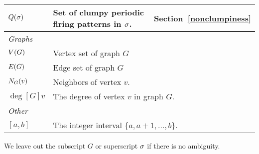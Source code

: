 \begin{centering}
\begin{longtable}{l p{} l}
    $Q(\sigma)$ & Set of clumpy periodic firing patterns in $\sigma$. &
    Section~\ref{nonclumpiness} \vspace{\tablespace}\\

    \toprule
    \multicolumn{3}{l}{\emph{Graphs}} \\
    \midrule

    $V(G)$ & \multicolumn{2}{l}{Vertex set of graph $G$} \vspace{\tablespace}\\

    $E(G)$ & \multicolumn{2}{l}{Edge set of graph $G$} \vspace{\tablespace}\\

    $\N[G]{v}$ & \multicolumn{2}{l}{Neighbors of vertex $v$.}
    \vspace{\tablespace}\\

    $\deg[G]{v}$ & \multicolumn{2}{p{.815\textwidth}}{The degree of vertex $v$
      in graph $G$.} \vspace{\tablespace}\\

    \toprule
    \multicolumn{3}{l}{\emph{Other}} \\
    \midrule

    $[a,b]$ & \multicolumn{2}{l}{The integer interval $\{a, a+1, \dots, b\}$.}
  \end{longtable}
\end{centering}
\hidegame

We leave out the subscript $G$ or superscript $\sigma$ if there is no ambiguity.

